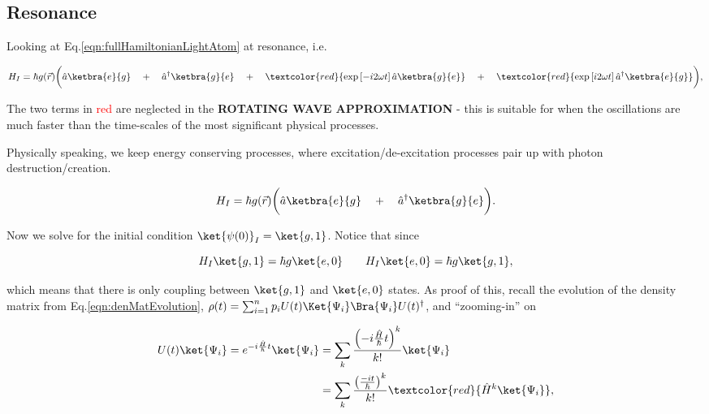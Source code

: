 \subsection{Resonance}

Looking at Eq.\eqref{eqn:fullHamiltonianLightAtom} at resonance, i.e. 

\begin{equation}
H_I = \hbar g(\vec{r}) \bigg(\hat{a}\ketbra{e}{g} \quad+\quad \hat{a}^\dagger\ketbra{g}{e} \quad+\quad \textcolor{red}{\exp\left[-i2\omega t\right]\hat{a}\ketbra{g}{e}} \quad+\quad \textcolor{red}{\exp\left[i2\omega t\right]\hat{a}^\dagger\ketbra{e}{g}}\bigg),
\end{equation}

\noindent The two terms in \textcolor{red}{red} are neglected in the \textbf{\large ROTATING WAVE APPROXIMATION} - this is suitable for when the oscillations are much faster than the time-scales of the most significant physical processes.

Physically speaking, we keep energy conserving processes, where excitation/de-excitation processes pair up with photon destruction/creation.

\begin{equation}
H_I = \hbar g(\vec{r}) \bigg(\hat{a}\ketbra{e}{g} \quad+\quad \hat{a}^\dagger\ketbra{g}{e} \bigg).
\label{eqn:rwa1}
\end{equation}
\vspace{6ex}

\noindent Now we solve for the initial condition $\ket{\psi(0)}_I = \ket{g,1}$. Notice that since

\begin{equation}
\label{eqn:effect}
H_I\ket{g,1} = \hbar g\ket{e,0} \qquad H_I\ket{e,0} = \hbar g\ket{g,1},
\end{equation}

\noindent which means that there is only coupling between $\ket{g,1}$ and $\ket{e,0}$ states. As proof of this, recall the evolution of the density matrix from Eq.\eqref{eqn:denMatEvolution}, $\rho(t) = \sum_{i=1}^{n} p_iU(t)\Ket{\Psi_i}\Bra{\Psi_i}U(t)^{\dagger}$, and ``zooming-in'' on

\begin{equation}
\label{eqn:resonance4}
\begin{aligned}
U(t)\ket{\Psi_i} = e^{-i\frac{\hat{H}}{\hbar}t}\ket{\Psi_i} & = \sum_k \frac{\left( -i\frac{\hat{H}}{\hbar}t\right)^k }{k!}\ket{\Psi_i}\\
& = \sum_k \frac{\left(\frac{-it}{\hbar}\right)^k }{k!}\textcolor{red}{\hat{H}^k\ket{\Psi_i}},
\end{aligned}
\end{equation}

